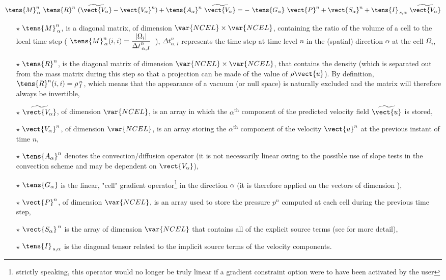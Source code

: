 \begin{equation}
\displaystyle
\tens{M}_{\,\alpha}^n\ \tens{R}^n\ (\widetilde{\vect{V_\alpha}} - \vect{V_\alpha}^n) +
\tens{A_\alpha}^n\ \widetilde{\vect{V_\alpha}} =
-\ \tens{G_\alpha}\ \vect{P}^n + \vect{S_\alpha}^n + \tens{I}_{\,s,\alpha}\ \widetilde{\vect{V_\alpha}}
\label{Base_Resopv_QDM}
\end{equation}
\begin{itemize}
\item[$\star$] $\tens{M}_{\,\alpha}^n$, is a diagonal matrix, of dimension $ \var{NCEL} \times \var{NCEL}$, containing the ratio of the volume of a cell to the local time step ($\ \displaystyle {\tens{M}_{\,\alpha}^n}(i,i) = \frac{|\Omega_i|}{{\Delta t}_{\,\alpha,I}^n} $\ ), ${\Delta t}_{\alpha,I}^n$ represents the time step at time level $n$ in the (spatial) direction $\alpha$ at the cell $\Omega_i$,
\item[$\star$] $ \tens{R}^n $, is the diagonal matrix of dimension $\var{NCEL} \times \var{NCEL}$, that contains the density (which is separated out from the mass matrix during this step so that a projection can be made of the value of $\rho \vect{u} $). By definition, $ \tens{R}^n(i,i) = \rho^{\,n}_{\,I}$, which means that the appearance of a vacuum (or null space) is naturally excluded and the matrix will therefore always be invertible,
\item[$\star$] $\widetilde{\vect{V_\alpha}}$, of dimension $\var{NCEL}$, is an array in which the $\alpha^{\text{th}}$ component of the predicted velocity field $\widetilde{\vect{u}}$ is stored,
\item[$\star$] $\vect{V_\alpha}^n$, of dimension $\var{NCEL}$, is an array storing the $\alpha^{\text{th}}$ component of the velocity $\vect{u}^n$ at the previous instant of time $n$,
\item[$\star$] $\tens{A_\alpha}^n$ denotes the convection/diffusion operator (it is not necessarily linear owing to the possible use of slope tests in the convection scheme and may be dependent on $\vect{V_\alpha}$),

\item[$\star$] $\tens{G_\alpha}$ is the linear, "cell" gradient operator\footnote{strictly speaking, this operator would no longer be truly linear if a gradient constraint option were to have been activated by the user} in the direction $\alpha$ (it is therefore applied on the vectors of dimension ),
\item[$\star$] $\vect{P}^n$, of dimension $\var{NCEL}$, is an array used to store the pressure $p^n$ computed at each cell during the previous time step,

\item[$\star$] $\vect{S_\alpha}^{\,n}$ is the array of dimension $\var{NCEL}$ that contains all of the explicit source terms (see  for more detail),

\item[$\star$] $\tens{I}_{\,s,\alpha}$ is the diagonal tensor related to the implicit source terms of the velocity components.
\end{itemize}

